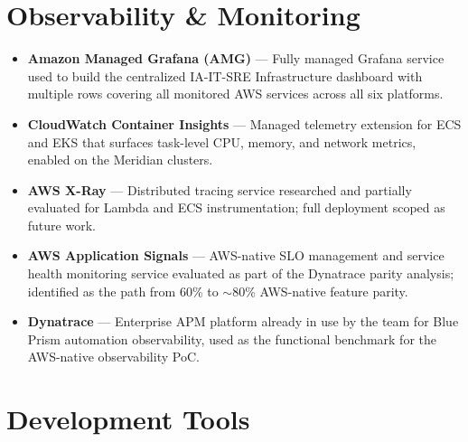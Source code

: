 \FloatBarrier

\section{Observability \& Monitoring}
\label{sec:tools_observability}


\begin{itemize}

    \item \textbf{Amazon Managed Grafana (AMG)} --- Fully managed
          Grafana service used to build the centralized IA-IT-SRE
          Infrastructure dashboard with multiple rows covering all monitored
          AWS services across all six platforms.

    \item \textbf{CloudWatch Container Insights} --- Managed telemetry
          extension for ECS and EKS that surfaces task-level CPU,
          memory, and network metrics, enabled on the Meridian clusters.

    \item \textbf{AWS X-Ray} --- Distributed tracing service researched
          and partially evaluated for Lambda and ECS instrumentation;
          full deployment scoped as future work.

    \item \textbf{AWS Application Signals} --- AWS-native SLO management
          and service health monitoring service evaluated as part of the
          Dynatrace parity analysis; identified as the path from 60\%
          to $\sim$80\% AWS-native feature parity.

    \item \textbf{Dynatrace} --- Enterprise APM platform already in use
          by the team for Blue Prism automation observability, used as the
          functional benchmark for the AWS-native observability PoC.

\end{itemize}


\FloatBarrier

\section{Development Tools}
\label{sec:tools_dev}



